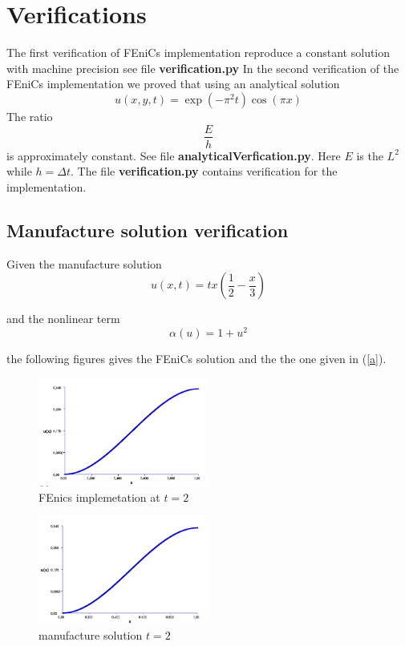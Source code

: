\documentclass[10pt,a4paper]{report}
\begin{document}
\section{Verifications}
The first verification of FEniCs implementation reproduce a constant solution with machine precision see file \textbf{verification.py} In the second verification of the FEniCs implementation we proved that using an analytical solution 
\begin{equation}
u(x,y,t) = \exp(-\pi^{2} t)\cos(\pi x)
\end{equation}
 The ratio
 \begin{equation}
 \frac{E}{h} \nonumber
 \end{equation}
 is approximately constant. See file \textbf{analyticalVerfication.py}. Here $E$ is the $L^{2}$ while $h = \Delta t$. The file \textbf{verification.py} contains verification for the implementation.
 
\subsection{Manufacture solution verification}
Given the manufacture solution
\begin{equation}\label{a}
u(x,t) = tx\left(  \frac{1}{2}-\frac{x}{3}\right) \nonumber
\end{equation}

and the nonlinear term 
\begin{equation}
\alpha (u) = 1+u^{2} \nonumber
\end{equation}

the following figures gives the FEniCs solution and the the one given in (\ref{a}).

\begin{figure}[H]
  \caption{FEnics implemetation at $t=2$}
  \centering
    \includegraphics[width=0.5\textwidth]{fenics2.png}
\end{figure}

\begin{figure}[H]
  \caption{manufacture solution $t=2$}
  \centering
    \includegraphics[width=0.5\textwidth]{an.png}
\end{figure}
\end{document}
